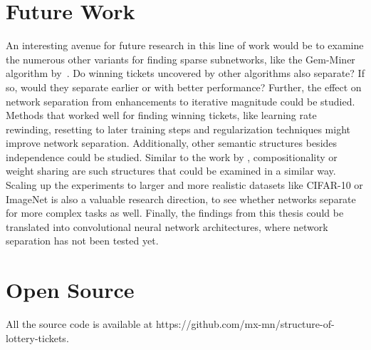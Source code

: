 \section{Future Work}
An interesting avenue for future research in this line of work would be to examine the numerous other variants for finding sparse subnetworks, like the Gem-Miner algorithm by~\textcite{RareGems}.
Do winning tickets uncovered by other algorithms also separate?
If so, would they separate earlier or with better performance?
Further, the effect on network separation from enhancements to iterative magnitude could be studied.
Methods that worked well for finding winning tickets, like learning rate rewinding, resetting to later training steps and regularization techniques might improve network separation.
Additionally, other semantic structures besides independence could be studied.
Similar to the work by \textcite{BIMT}, compositionality or weight sharing are such structures that could be examined in a similar way.
Scaling up the experiments to larger and more realistic datasets like CIFAR-10 or ImageNet is also a valuable research direction, to see whether networks separate for more complex tasks as well.
Finally, the findings from this thesis could be translated into convolutional neural network architectures, where network separation has not been tested yet.

\section{Open Source}
All the source code is available at https://github.com/mx-mn/structure-of-lottery-tickets.